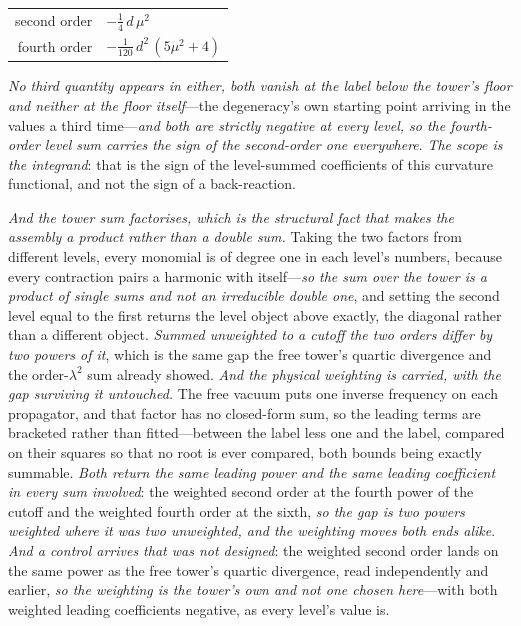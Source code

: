 \documentclass[11pt,a4paper]{article}
\theoremstyle{plain}
\theoremstyle{definition}
\theoremstyle{remark}
\begin{document}
\begin{center}
\begin{tabular}{rl}
second order & $-\tfrac14\,d\,\mu^{2}$ \\
fourth order & $-\tfrac{1}{120}\,d^{2}\,(5\mu^{2}+4)$ \\
\end{tabular}
\end{center}

\noindent\emph{No third quantity appears in either, both vanish at the label below the tower's floor and
neither at the floor itself}---the degeneracy's own starting point arriving in the values a third time---\emph{and
both are strictly negative at every level, so the fourth-order level sum carries the sign of the second-order
one everywhere}. \emph{The scope is the integrand}: that is the sign of the level-summed coefficients of this
curvature functional, and not the sign of a back-reaction.

\emph{And the tower sum factorises, which is the structural fact that makes the assembly a product rather than
a double sum.} Taking the two factors from different levels, every monomial is of degree one in each level's
numbers, because every contraction pairs a harmonic with itself---\emph{so the sum over the tower is a product
of single sums and not an irreducible double one}, and setting the second level equal to the first returns the
level object above exactly, the diagonal rather than a different object. \emph{Summed unweighted to a cutoff the
two orders differ by two powers of it}, which is the same gap the free tower's quartic divergence and the
order-$\lambda^2$ sum already showed. \emph{And the physical weighting is carried, with the gap surviving it untouched.} The free vacuum puts one
inverse frequency on each propagator, and that factor has no closed-form sum, so the leading terms are bracketed
rather than fitted---between the label less one and the label, compared on their squares so that no root is ever
compared, both bounds being exactly summable. \emph{Both return the same leading power and the same leading
coefficient in every sum involved}: the weighted second order at the fourth power of the cutoff and the weighted
fourth order at the sixth, \emph{so the gap is two powers weighted where it was two unweighted, and the
weighting moves both ends alike}. \emph{And a control arrives that was not designed}: the weighted second order
lands on the same power as the free tower's quartic divergence, read independently and earlier, \emph{so the
weighting is the tower's own and not one chosen here}---with both weighted leading coefficients negative, as
every level's value is.
\end{document}

